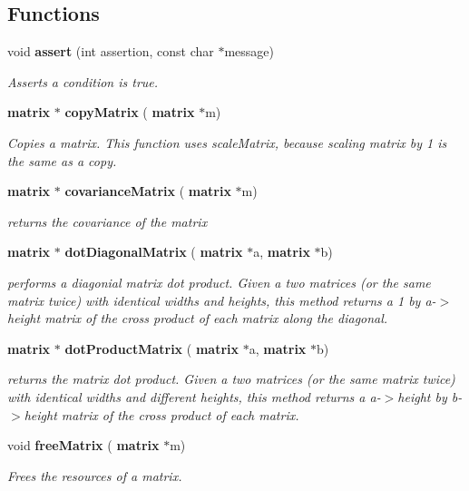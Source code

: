 \subsection*{Functions}
\begin{DoxyCompactItemize}
\item 
void \textbf{ assert} (int assertion, const char $\ast$message)
\begin{DoxyCompactList}\small\item\em Asserts a condition is true. \end{DoxyCompactList}\item 
\textbf{ matrix} $\ast$ \textbf{ copy\+Matrix} (\textbf{ matrix} $\ast$m)
\begin{DoxyCompactList}\small\item\em Copies a matrix. This function uses scale\+Matrix, because scaling matrix by 1 is the same as a copy. \end{DoxyCompactList}\item 
\textbf{ matrix} $\ast$ \textbf{ covariance\+Matrix} (\textbf{ matrix} $\ast$m)
\begin{DoxyCompactList}\small\item\em returns the covariance of the matrix \end{DoxyCompactList}\item 
\textbf{ matrix} $\ast$ \textbf{ dot\+Diagonal\+Matrix} (\textbf{ matrix} $\ast$a, \textbf{ matrix} $\ast$b)
\begin{DoxyCompactList}\small\item\em performs a diagonial matrix dot product. Given a two matrices (or the same matrix twice) with identical widths and heights, this method returns a 1 by a-\/$>$height matrix of the cross product of each matrix along the diagonal. \end{DoxyCompactList}\item 
\textbf{ matrix} $\ast$ \textbf{ dot\+Product\+Matrix} (\textbf{ matrix} $\ast$a, \textbf{ matrix} $\ast$b)
\begin{DoxyCompactList}\small\item\em returns the matrix dot product. Given a two matrices (or the same matrix twice) with identical widths and different heights, this method returns a a-\/$>$height by b-\/$>$height matrix of the cross product of each matrix. \end{DoxyCompactList}\item 
void \textbf{ free\+Matrix} (\textbf{ matrix} $\ast$m)
\begin{DoxyCompactList}\small\item\em Frees the resources of a matrix. \end{DoxyCompactList}\item 

\end{DoxyCompactItemize}

